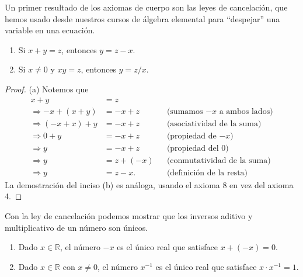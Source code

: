 \documentclass[12pt,a4paper]{book}
\begin{document}
  Un primer resultado de los axiomas de cuerpo son las leyes de cancelación, que hemos usado desde nuestros cursos de álgebra elemental para ``despejar'' una variable en una ecuación.
  
  \begin{proposicion}
    \begin{enumerate}[label=(\alph*)]
      \item Si $x+y=z$, entonces $y=z-x$.
      \item Si $x \neq 0$ y $xy=z$, entonces $y = z/x$.
    \end{enumerate}
  \end{proposicion}
  
  \begin{proof}
    (a) Notemos que
    \begin{align*}
      x+y                  & =z                                                \\
      \Rightarrow -x+(x+y) & = -x+z   &  & \text{(sumamos $-x$ a ambos lados)} \\
      \Rightarrow (-x+x)+y & = -x+z   &  & \text{(asociatividad de la suma)}   \\
      \Rightarrow 0+y      & = -x+z   &  & \text{(propiedad de $-x$)}          \\
      \Rightarrow y        & = -x+z   &  & \text{(propiedad del $0$)}          \\
      \Rightarrow y        & = z+(-x) &  & \text{(conmutatividad de la suma)}  \\
      \Rightarrow y        & = z-x.   &  & \text{(definición de la resta)}
    \end{align*}
    La demostración del inciso (b) es análoga, usando el axioma 8 en vez del axioma 4.
  \end{proof}
  
  Con la ley de cancelación podemos mostrar que los inversos aditivo y multiplicativo de un número son únicos.
  
  \begin{proposicion}
    \begin{enumerate}[label=(\alph*)]
      \item Dado $x \in \mathbb{R}$, el número $-x$ es el único real que satisface $x+(-x)=0$.
      \item Dado $x \in \mathbb{R}$ con $x \neq 0$, el número $x^{-1}$ es el único real que satisface $x \cdot x^{-1}=1$.
    \end{enumerate}
  \end{proposicion}
  
\end{document}

